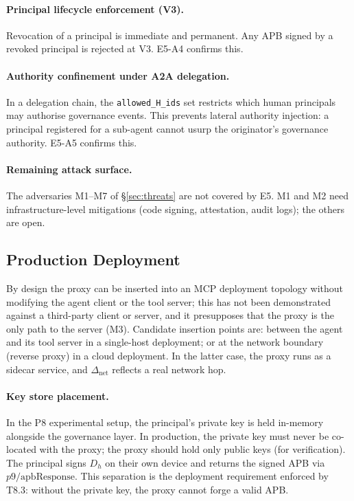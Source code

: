 \documentclass[11pt]{article}
\newcommand{\Dh}{D_h}
\newcommand{\Dnet}{\Delta_{\mathrm{net}}}
\begin{document}
\paragraph{Principal lifecycle enforcement (V3).}
Revocation of a principal is immediate and permanent.
Any APB signed by a revoked principal is rejected at V3.
E5-A4 confirms this.

\paragraph{Authority confinement under A2A delegation.}
In a delegation chain, the \texttt{allowed\_H\_ids} set restricts which
human principals may authorise governance events.
This prevents lateral authority injection: a principal registered for a
sub-agent cannot usurp the originator's governance authority.
E5-A5 confirms this.

\paragraph{Remaining attack surface.}
The adversaries M1--M7 of \S\ref{sec:threats} are not covered by E5.
M1 and M2 need infrastructure-level mitigations (code signing,
attestation, audit logs); the others are open.

\subsection{Production Deployment}

By design the proxy can be inserted into an MCP deployment topology
without modifying the agent client or the tool server; this has not
been demonstrated against a third-party client or server, and it
presupposes that the proxy is the only path to the server (M3).
Candidate insertion points are: between the agent and its tool server
in a single-host deployment; or at the network boundary (reverse
proxy) in a cloud deployment. In the latter case, the proxy runs as
a sidecar service, and $\Dnet$ reflects a real network hop.

\paragraph{Key store placement.}
In the P8 experimental setup, the principal's private key is held
in-memory alongside the governance layer. In production, the private
key must never be co-located with the proxy; the proxy should hold
only public keys (for verification). The principal signs $\Dh$ on
their own device and returns the signed APB via $p9/\mathrm{apbResponse}$.
This separation is the deployment requirement enforced by T8.3:
without the private key, the proxy cannot forge a valid APB.
\end{document}
